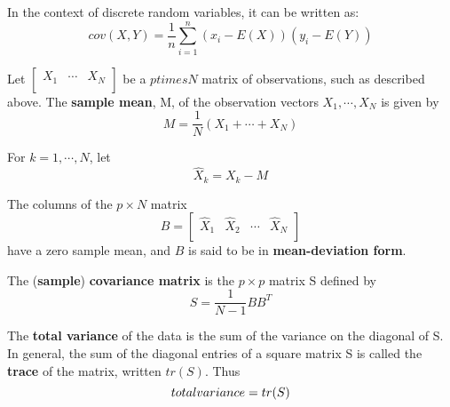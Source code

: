 In the context of discrete random variables, it can be written as:
\[
    cov(X, Y) = \dfrac{1}{n} \sum_{i = 1}^n (x_i - E(X))(y_i - E(Y)) 
\]

Let \(\begin{bmatrix}
    X_1 & \cdots & X_N  \\
\end{bmatrix}\) be a \(p times N\) matrix of observations, such as described above. The \textbf{sample mean}, M, of the observation vectors \(X_1, \cdots, X_N\) is given by
\[
    M = \dfrac{1}{N} (X_1 + \cdots + X_N)
\]

For \(k = 1, \cdots, N\), let
\[
    \hat{X}_k = X_k - M
\]

The columns of the \(p \times N\) matrix 
\[
    B = \begin{bmatrix}
       \hat{X}_1  & \hat{X}_2 & \cdots  & \hat{X}_N \\
    \end{bmatrix}    
\]
have a zero sample mean, and \(B\) is said to be in \textbf{mean-deviation form}.  

The (\textbf{sample}) \textbf{covariance matrix} is the \(p \times p\) matrix S defined by 
\[
    S = \dfrac{1}{N - 1} B B^T
\]

The \textbf{total variance}  of the data is the sum of the variance on the diagonal of S. In general, the sum of the diagonal entries of a square matrix S is called the \textbf{trace} of the matrix, written \(tr(S)\). Thus 
\[
    {total \space variance} = tr(S)
\]